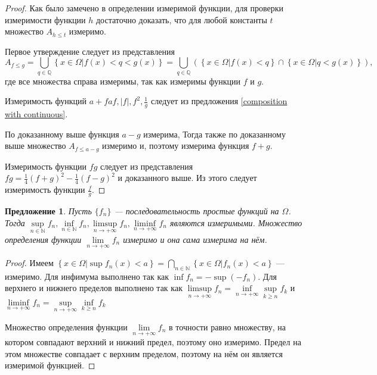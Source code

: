 \documentclass[12pt]{article}
\newtheorem{proposition}[theorem]{Предложение}
\numberwithin{theorem}{section}
\theoremstyle{definition}
\newcommand{\defineset}[2]{\left\{
	\left.
	#1
	\right\vert
	#2
	\right\}}
\begin{document}
	\begin{proof}
		Как было замечено в определении измеримой функции,
		для проверки измеримости функции $ h $ достаточно доказать, что 
		для любой константы $ t $ множество $ A_{h \leqslant t} $ измеримо. 
		
		Первое утверждение следует из представления
		$$ A_{f \leqslant g} = \bigcup\limits_{q \in \mathbb{Q}} \defineset{x \in \Omega}{f(x) < q < g(x)}
		= \bigcup\limits_{q \in \mathbb{Q}} \left(\defineset{x \in \Omega}{f(x) < q} 
		\cap \defineset{x \in \Omega}{q < g(x)} \right), $$
		где все множества справа измеримы, так как измеримы функции $ f $ и $ g $.
		
		Измеримость функций $ a + f af, |f|, f^2, \tfrac{1}{g} $ следует из предложения \ref{composition with continuous}.
		
		По доказанному выше функция $ a - g $ измерима, 
		Тогда также по доказанному выше множество $ A_{f \leqslant a - g} $ измеримо и, 
		поэтому измерима функция $ f + g $.
		
		Измеримость функции $ fg $ следует из представления $ fg = \tfrac{1}{4}(f + g)^2 - \tfrac{1}{4}(f - g)^2 $
		и доказанного выше. Из этого следует измеримость функции $ \tfrac{f}{g} $.
	\end{proof}
	
	\begin{proposition}
		Пусть $ \{f_n\} $ --- последовательность простые функций на $ \Omega $.
		Тогда $ \sup\limits_{n \in \mathbb{N}} f_n, \inf\limits_{n \in \mathbb{N}} f_n,
		\limsup\limits_{n \to +\infty} f_n, \liminf\limits_{n \to +\infty} f_n $
		являются измеримыми. Множество определения функции $ \lim\limits_{n \to +\infty} f_n $
		измеримо и она сама измерима на нём.
	\end{proposition}
	
	\begin{proof}
		Имеем $ \defineset{x \in \Omega}{\sup f_n(x) < a} 
		= \bigcap_{n \in \mathbb{N}} \defineset{x \in \Omega}{f_n(x) < a}$ --- измеримо.
		Для инфимума выполнено так как $ \inf f_n = -\sup (-f_n) $.
		Для верхнего и нижнего пределов выполнено так как
		$ \limsup\limits_{n \to +\infty} f_n = \inf\limits_{n \to +\infty} \sup\limits_{k \geqslant n} f_k $
		и $ \liminf\limits_{n \to +\infty} f_n = \sup\limits_{n \to +\infty} \inf\limits_{k \geqslant n} f_k $
		
		Множество определения функции $ \lim\limits_{n \to +\infty} f_n $
		в точности равно множеству, на котором совпадают верхний и нижний предел,
		поэтому оно измеримо. Предел на этом множестве совпадает с верхним пределом,
		поэтому на нём он является измеримой функцией.
	\end{proof}
	
\end{document}
